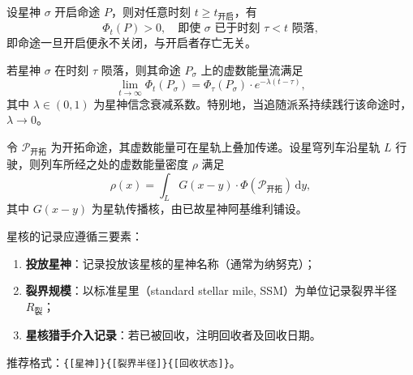 \begin{axiom}[命途不可逆公理]
    设星神 $\sigma$ 开启命途 $P$，则对任意时刻 $t \geq t_{\text{开启}}$，有
    \begin{equation}
        \Phi_t(P) > 0,\quad \text{即使 } \sigma \text{ 已于时刻 } \tau < t \text{ 陨落},
    \end{equation}
    即命途一旦开启便永不关闭，与开启者存亡无关。
\end{axiom}

\begin{theorem}[命途残留定理]
    若星神 $\sigma$ 在时刻 $\tau$ 陨落，则其命途 $P_\sigma$ 上的虚数能量流满足
    \begin{equation}
        \lim_{t \to \infty} \Phi_t(P_\sigma) = \Phi_\tau(P_\sigma) \cdot e^{-\lambda(t - \tau)},
    \end{equation}
    其中 $\lambda \in (0, 1)$ 为星神信念衰减系数。特别地，当追随派系持续践行该命途时，$\lambda \to 0$。
\end{theorem}

\begin{lemma}[虚数能量叠加原理]
    令 $\mathcal{P}_{\text{开拓}}$ 为开拓命途，其虚数能量可在星轨上叠加传递。设星穹列车沿星轨 $L$ 行驶，则列车所经之处的虚数能量密度 $\rho$ 满足
    \begin{equation}
        \rho(x) = \int_L G(x - y) \cdot \Phi(\mathcal{P}_{\text{开拓}}) \,\mathrm{d}y,
    \end{equation}
    其中 $G(x - y)$ 为星轨传播核，由已故星神阿基维利铺设。
\end{lemma}

\begin{definition}[星核记录规范]
    星核的记录应遵循三要素：
    \begin{enumerate}[nosep, leftmargin=3.5em, labelsep=0.5em]
        \item \textbf{投放星神}：记录投放该星核的星神名称（通常为纳努克）；
        \item \textbf{裂界规模}：以标准星里（standard stellar mile, SSM）为单位记录裂界半径 $R_{\text{裂}}$；
        \item \textbf{星核猎手介入记录}：若已被回收，注明回收者及回收日期。
    \end{enumerate}
    推荐格式：\texttt{\{[星神]\}\{[裂界半径]\}\{[回收状态]\}}。
\end{definition}

